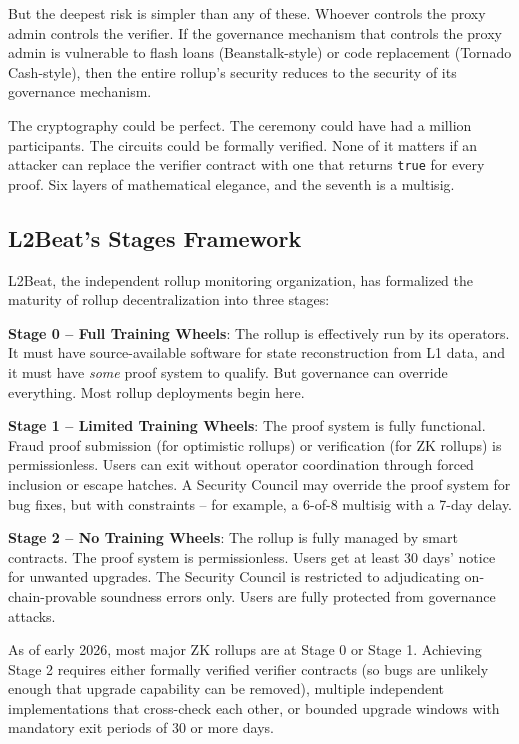 \documentclass[
  11pt,
  openany]{report}
\renewcommand{\textbf}[1]{{\bfseries\color{MidnightBold}#1}}
\begin{document}
But the deepest risk is simpler than any of these. Whoever controls the proxy
admin controls the verifier. If the governance mechanism that controls the proxy
admin is vulnerable to flash loans (Beanstalk-style) or code replacement
(Tornado Cash-style), then the entire rollup's security reduces to the security
of its governance mechanism.

The cryptography could be perfect. The ceremony could have had a million
participants. The circuits could be formally verified. None of it matters if an
attacker can replace the verifier contract with one that returns \texttt{true}
for every proof. Six layers of mathematical elegance, and the seventh is a
multisig.

\subsection{L2Beat's Stages Framework}\label{l2beats-stages-framework}

L2Beat, the independent rollup monitoring organization, has formalized the
maturity of rollup decentralization into three stages:

\textbf{Stage 0 -- Full Training Wheels}: The rollup is effectively run by its
operators. It must have source-available software for state reconstruction from
L1 data, and it must have \emph{some} proof system to qualify. But governance
can override everything. Most rollup deployments begin here.

\textbf{Stage 1 -- Limited Training Wheels}: The proof system is fully
functional. Fraud proof submission (for optimistic rollups) or verification (for
ZK rollups) is permissionless. Users can exit without operator coordination
through forced inclusion or escape hatches. A Security Council may override the
proof system for bug fixes, but with constraints -- for example, a 6-of-8
multisig with a 7-day delay.

\textbf{Stage 2 -- No Training Wheels}: The rollup is fully managed by smart
contracts. The proof system is permissionless. Users get at least 30 days'
notice for unwanted upgrades. The Security Council is restricted to adjudicating
on-chain-provable soundness errors only. Users are fully protected from
governance attacks.

As of early 2026, most major ZK rollups are at Stage 0 or Stage 1. Achieving
Stage 2 requires either formally verified verifier contracts (so bugs are
unlikely enough that upgrade capability can be removed), multiple independent
implementations that cross-check each other, or bounded upgrade windows with
mandatory exit periods of 30 or more days.
\end{document}

